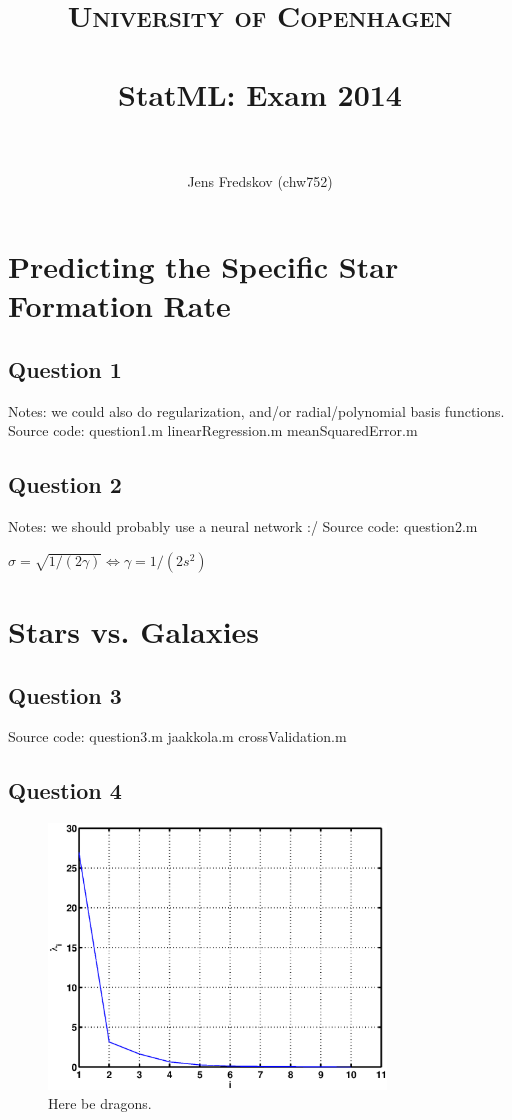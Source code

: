 \documentclass[a4paper, 11pt]{article}
\title{ 
\normalfont \normalsize 
\textsc{University of Copenhagen} \\ [25pt]
\horrule{0.5pt} \\[0.4cm]
\huge StatML: Exam 2014\\
\horrule{2pt} \\[0.5cm]
}
\author{Jens Fredskov (chw752)}
\begin{document}
\maketitle

\section{Predicting the Specific Star Formation Rate} %
\label{sec:predicting_the_specific_star_formation_rate}

\subsection*{Question 1}
Notes: we could also do regularization, and/or radial/polynomial basis functions.
Source code: question1.m linearRegression.m meanSquaredError.m

\subsection*{Question 2}
Notes: we should probably use a neural network :/
Source code: question2.m

$\sigma = \sqrt{1 / (2 \gamma)} \Leftrightarrow \gamma = 1 / (2s^2)$


\section{Stars vs. Galaxies} %
\label{sec:stars_vs_galaxies}

\subsection*{Question 3}

Source code: question3.m jaakkola.m crossValidation.m

\subsection*{Question 4}

\begin{figure}[H]
    \centering
    \includegraphics[width=0.8\textwidth]{figures/question4_1}
    \caption{Here be dragons.}
    \label{fig:question4_1}
\end{figure}
\end{document}
